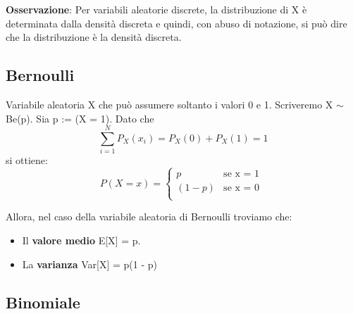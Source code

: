 \noindent \textbf{Osservazione}: Per variabili aleatorie discrete, la distribuzione di X è determinata dalla densità discreta e quindi, con abuso di notazione, si può dire che la distribuzione è la densità discreta.

\subsection{Bernoulli}

Variabile aleatoria X che può assumere soltanto i valori 0 e 1. Scriveremo \newline X $\sim$ Be(p). Sia p := (X = 1). Dato che $$\sum_{i=1}^{N} P_X(x_i) = P_X(0) + P_X(1) = 1$$ si ottiene:
\begin{equation}
  P(X = x) =
    \begin{cases}
      p & \text{se x = 1 }\\
      (1 - p) & \text{se x = 0 }\\
    \end{cases}       
\end{equation}


\noindent Allora, nel caso della variabile aleatoria di Bernoulli troviamo che:
\begin{itemize}
    \item Il \textbf{valore medio} E[X] = p.
    \item La \textbf{varianza} Var[X] = p(1 - p)
\end{itemize}

\subsection{Binomiale}

